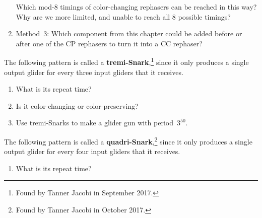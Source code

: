 \begin{multicols}{2}
\begin{problem}
\begin{enumerate}[label=\bf\color{ocre}(\alph*)]
			\noindent Which mod-$8$ timings of color-changing rephasers can be reached in this way? Why are we more limited, and unable to reach all $8$ possible timings?
			
			\item {} Method~$3$: Which component from this chapter could be added before or after one of the CP rephasers to turn it into a CC rephaser?
		\end{enumerate}
	\end{problem}
	
	
	\mfilbreak
	
	
	\begin{problem}\label{exer:tremi_snark}
		The following pattern is called a \textbf{tremi-Snark},\footnote{Found by Tanner Jacobi in September 2017.} since it only produces a single output glider for every three input gliders that it receives.
		
		\begin{center}
		\end{center}
		
		\begin{enumerate}[label=\bf\color{ocre}(\alph*)]
			\item {} What is its repeat time?%
			
			\item {} Is it color-changing or color-preserving?%
			
			\item {} Use tremi-Snarks to make a glider gun with period~$3^{50}$.
		\end{enumerate}
	\end{problem}
	
	
	\mfilbreak
	
	
	\begin{problem}\label{exer:quadri_snark}
		The following pattern is called a \textbf{quadri-Snark},\footnote{Found by Tanner Jacobi in October 2017.} since it only produces a single output glider for every four input gliders that it receives.
		
		\begin{center}
		\end{center}
		
		\begin{enumerate}[label=\bf\color{ocre}(\alph*)]
			\item {} What is its repeat time?%
			

\end{enumerate}
\end{problem}
\end{multicols}
